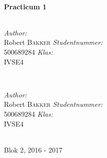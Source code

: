 \documentclass[12pt,notitlepage]{article}
\begin{document}
\begin{titlepage}
\HRule \\[0.4cm]
{ \huge \bfseries Practicum 1}\\[0.2cm] %
\HRule \\[1.2cm]



\begin{minipage}{0.4\textwidth}
\begin{flushleft} \large
\emph{Author:}\\
Robert \textsc{Bakker} %
\linebreak
\linebreak
\emph{Studentnummer:}\\
500689284
\linebreak
\linebreak
\emph{Klas:}\\
IVSE4

\end{flushleft}
\end{minipage}
~
\begin{minipage}{0.4\textwidth}
\begin{flushright} \large
\emph{Author:}\\
Robert \textsc{Bakker} %
\linebreak
\linebreak
\emph{Studentnummer:}\\
500689284
\linebreak
\linebreak
\emph{Klas:}\\
IVSE4
\end{flushright}
\end{minipage}\\[4cm]


{\large Blok 2, 2016 - 2017}\\[3cm] %




\vfill %

\end{titlepage}
\end{document}
